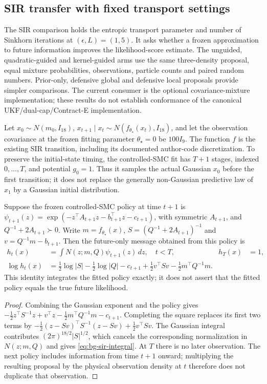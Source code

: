 \subsection{SIR transfer with fixed transport settings}
\label{sec:bg-sir-fixed-ot}

The SIR comparison holds the entropic transport parameter and number of
Sinkhorn iterations at $(\epsilon,L)=(1,5)$. It asks whether a frozen
approximation to future information improves the likelihood-score estimate.
The unguided, quadratic-guided and kernel-guided arms use the same
three-density proposal, equal mixture probabilities, observations, particle
counts and paired random numbers. Prior-only, defensive global and defensive
local proposals provide simpler comparisons. The current consumer is the
optional covariance-mixture implementation; these results do not establish
conformance of the canonical UKF/dual-cap/Contract-E implementation.

Let $x_0\sim N(m_0,I_{18})$, $x_{t+1}\mid x_t\sim
N(f_{\theta_\star}(x_t),I_{18})$, and let the observation covariance at the
frozen fitting parameter $\theta_\star=0$ be $100I_9$. The function $f$
is the existing SIR transition, including its documented author-code
discretization. To preserve the initial-state timing, the controlled-SMC
fit has $T+1$ stages, indexed $0,\ldots,T$, and potential $g_0=1$.
Thus it samples the actual Gaussian $x_0$ before the first transition;
it does not replace the generally non-Gaussian predictive law of $x_1$
by a Gaussian initial distribution.

\begin{proposition}
\label{prop:bg-sir-next-policy}
Suppose the frozen controlled-SMC policy at time $t+1$ is
$\psi_{t+1}(z)=\exp(-z^\top A_{t+1}z-b_{t+1}^\top z-c_{t+1})$,
with symmetric $A_{t+1}$, and $Q^{-1}+2A_{t+1}\succ0$.
Write $m=f_{\theta_\star}(x)$, $S=(Q^{-1}+2A_{t+1})^{-1}$ and
$v=Q^{-1}m-b_{t+1}$. Then the future-only message obtained from this
policy is
\begin{align}
 h_t(x)&=\int N(z;m,Q)\psi_{t+1}(z)\,dz,\quad t<T,
 &h_T(x)&=1,\\
 \log h_t(x)&=\tfrac12\log|S|-\tfrac12\log|Q|-c_{t+1}
 +\tfrac12v^\top Sv-\tfrac12m^\top Q^{-1}m.
 \label{eq:bg-sir-integral}
\end{align}
This identity integrates the fitted policy exactly; it does not assert that
the fitted policy equals the true future likelihood.
\end{proposition}
\begin{proof}
Combining the Gaussian exponent and the policy gives
$-\tfrac12 z^\top S^{-1}z+v^\top z
-\tfrac12m^\top Q^{-1}m-c_{t+1}$.
Completing the square replaces its first two terms by
$-\tfrac12(z-Sv)^\top S^{-1}(z-Sv)+\tfrac12v^\top Sv$.
The Gaussian integral contributes $(2\pi)^{18/2}|S|^{1/2}$,
which cancels the corresponding normalization in $N(z;m,Q)$ and gives
\eqref{eq:bg-sir-integral}. At $T$ there is no later observation.
The next policy includes information from time $t+1$ onward; multiplying
the resulting proposal by the physical observation density at $t$ therefore
does not duplicate that observation.
\end{proof}

